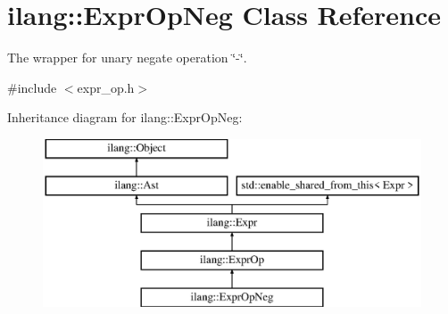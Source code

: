 \hypertarget{classilang_1_1_expr_op_neg}{}\section{ilang\+:\+:Expr\+Op\+Neg Class Reference}
\label{classilang_1_1_expr_op_neg}


The wrapper for unary negate operation \char`\"{}-\/\char`\"{}.  




{\ttfamily \#include $<$expr\+\_\+op.\+h$>$}

Inheritance diagram for ilang\+:\+:Expr\+Op\+Neg\+:\begin{figure}[H]
\begin{center}
\leavevmode
\includegraphics[height=5.000000cm]{classilang_1_1_expr_op_neg}
\end{center}
\end{figure}
